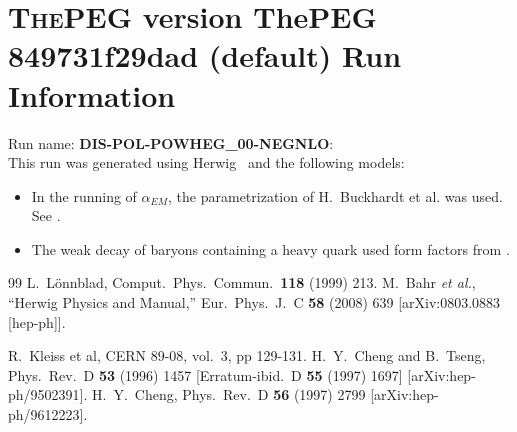 \documentclass{article}
\begin{document}
\appendix
\section[xxx]{\textsc{ThePEG} version ThePEG 849731f29dad (default) \cite{ThePEG} Run Information}
Run name: \textbf{DIS-POL-POWHEG_00-NEGNLO}:\\
This run was generated using Herwig~\cite{Bahr:2008pv} and the following models:
\begin{itemize}
\item In the running of $\alpha_{EM}$, the parametrization of H.~Buckhardt et al. was used. See \cite{KLEISSCERN9808v3pp129}.
\item The weak decay of baryons containing a heavy quark used form factors from \cite{Cheng:1995fe,Cheng:1996cs}.
\end{itemize}

\begin{thebibliography}{99}
 L.~L\"onnblad, Comput.~Phys.~Commun.\ {\bf 118} (1999) 213.
  M.~Bahr {\it et al.},
  ``Herwig Physics and Manual,''
  Eur.\ Phys.\ J.\  C {\bf 58} (2008) 639
  [arXiv:0803.0883 [hep-ph]].

 R.~Kleiss et al, CERN 89-08, vol.~3, pp 129-131.
  H.~Y.~Cheng and B.~Tseng,
  Phys.\ Rev.\  D {\bf 53} (1996) 1457
  [Erratum-ibid.\  D {\bf 55} (1997) 1697]
  [arXiv:hep-ph/9502391].
  H.~Y.~Cheng,
  Phys.\ Rev.\  D {\bf 56} (1997) 2799
  [arXiv:hep-ph/9612223].

\end{thebibliography}
\end{document}
